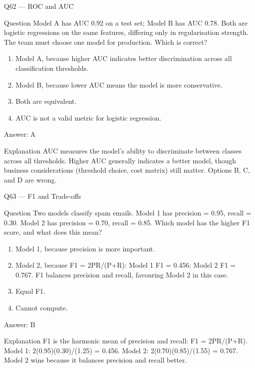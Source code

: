 \documentclass[aspectratio=169,8pt]{beamer}
\begin{document}
	\begin{frame}{Q62 --- ROC and AUC}
		\begin{block}{Question}
			Model A has AUC 0.92 on a test set; Model B has AUC 0.78. Both are logistic regressions on the same features, differing only in regularisation strength. The team must choose one model for production. Which is correct?
		\end{block}
		\begin{enumerate}
			\item Model A, because higher AUC indicates better discrimination across all classification thresholds.
			\item Model B, because lower AUC means the model is more conservative.
			\item Both are equivalent.
			\item AUC is not a valid metric for logistic regression.
		\end{enumerate}
		\begin{exampleblock}{Answer: A}\end{exampleblock}
		\begin{block}{Explanation}
			AUC measures the model's ability to discriminate between classes across all thresholds. Higher AUC generally indicates a better model, though business considerations (threshold choice, cost matrix) still matter. Options B, C, and D are wrong.
		\end{block}
	\end{frame}
	
	\begin{frame}{Q63 --- F1 and Trade-offs}
		\begin{block}{Question}
			Two models classify spam emails. Model 1 has precision = 0.95, recall = 0.30. Model 2 has precision = 0.70, recall = 0.85. Which model has the higher F1 score, and what does this mean?
		\end{block}
		\begin{enumerate}
			\item Model 1, because precision is more important.
			\item Model 2, because F1 = 2PR/(P+R): Model 1 F1 = 0.456; Model 2 F1 = 0.767. F1 balances precision and recall, favouring Model 2 in this case.
			\item Equal F1.
			\item Cannot compute.
		\end{enumerate}
		\begin{exampleblock}{Answer: B}\end{exampleblock}
		\begin{block}{Explanation}
			F1 is the harmonic mean of precision and recall: F1 = 2PR/(P+R). Model 1: 2(0.95)(0.30)/(1.25) = 0.456. Model 2: 2(0.70)(0.85)/(1.55) = 0.767. Model 2 wins because it balances precision and recall better.
		\end{block}
	\end{frame}
	
\end{document}
